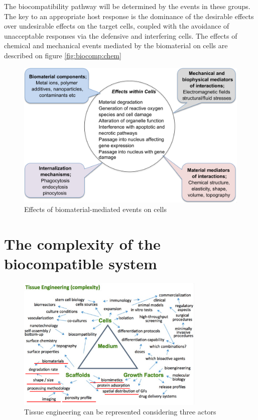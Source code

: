 		The biocompatibility pathway will be determined by the events in these groups.
		The key to an appropriate host response is the dominance of the desirable effects over undesirable effects on the target cells, coupled with the avoidance of unacceptable responses via the defensive and interfering cells.
		The effects of chemical and mechanical events mediated by the biomaterial on cells are described on figure \ref{fig:biocomp:chem}


		\begin{figure}[ht]
			\includegraphics[width=\textwidth]{biocomp_chem.png}
			\caption{Effects of biomaterial-mediated events on cells}
			\label{fig:biocomp_chem}
		\end{figure}

\section{The complexity of the biocompatible system}

\begin{figure}[ht]
	\centering
	\includegraphics[width=0.8\textwidth]{piramide_completa.png}
	\caption{Tissue engineering can be represented considering three actors\label{fig:complete_pyramid}}
\end{figure}


